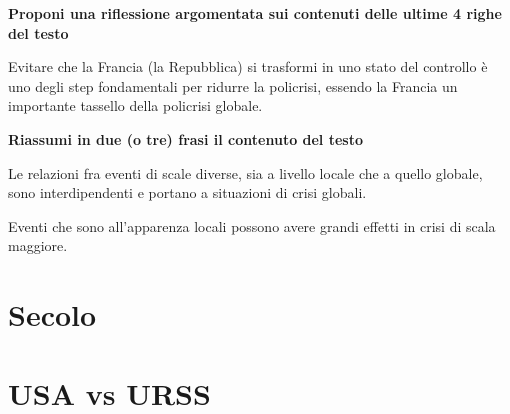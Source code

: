 \documentclass[a4paper]{article}
\begin{document}
\textbf{Proponi una riflessione argomentata sui contenuti delle ultime 4 righe del testo}

Evitare che la Francia (la Repubblica) si trasformi in uno stato del controllo
è uno degli step fondamentali per ridurre la policrisi,
essendo la Francia un importante tassello della policrisi globale.

\textbf{Riassumi in due (o tre) frasi il contenuto del testo}

Le relazioni fra eventi di scale diverse, sia a livello locale che a quello globale, 
sono interdipendenti e portano a situazioni di crisi globali.

Eventi che sono all'apparenza locali possono avere grandi effetti in crisi di scala maggiore.

\pagebreak

\section{Secolo}


\section{USA vs URSS}


\begin{center}
\end{center}

\end{document}
